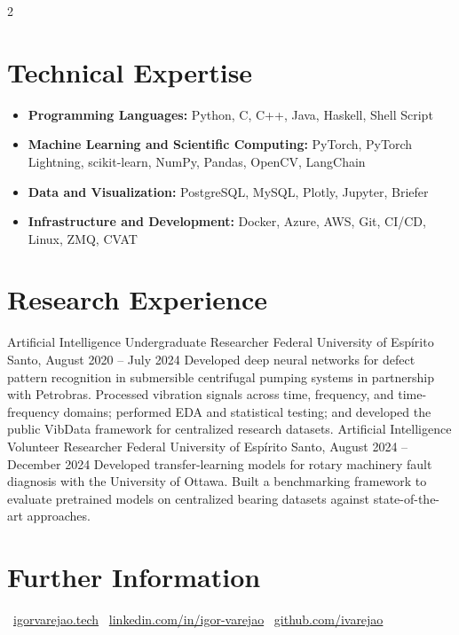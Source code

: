 \begin{multicols}{2}
\section{Technical Expertise}
\begin{itemize}[leftmargin=0.15in, label=\textbullet, itemsep=0pt, topsep=1pt]
  \item \textbf{Programming Languages:} Python, C, C++, Java, Haskell, Shell Script
  \item \textbf{Machine Learning and Scientific Computing:} PyTorch, PyTorch Lightning, scikit-learn, NumPy, Pandas, OpenCV, LangChain
  \item \textbf{Data and Visualization:} PostgreSQL, MySQL, Plotly, Jupyter, Briefer
  \item \textbf{Infrastructure and Development:} Docker, Azure, AWS, Git, CI/CD, Linux, ZMQ, CVAT
\end{itemize}

\section{Research Experience}
\columnresearch
  {Artificial Intelligence Undergraduate Researcher}
  {Federal University of Espírito Santo, August 2020 -- July 2024}
  {Developed deep neural networks for defect pattern recognition in submersible centrifugal pumping systems in partnership with Petrobras. Processed vibration signals across time, frequency, and time-frequency domains; performed EDA and statistical testing; and developed the public VibData framework for centralized research datasets.}
\vspace{10pt}
  \columnresearch
  {Artificial Intelligence Volunteer Researcher}
  {Federal University of Espírito Santo, August 2024 -- December 2024}
  {Developed transfer-learning models for rotary machinery fault diagnosis with the University of Ottawa. Built a benchmarking framework to evaluate pretrained models on centralized bearing datasets against state-of-the-art approaches.}

\renewcommand{\refname}{Selected Publications}

\nocite{VAREJAO2025112822,sehri2025universalvibrationanalysisdataset,LNLM2023-21022}



\end{multicols}

\section{Further Information}
\begin{center}
  \small
  \textbullet\ \href{https://igorvarejao.tech}{igorvarejao.tech} \quad
  \textbullet\ \href{https://www.linkedin.com/in/igor-varejao}{linkedin.com/in/igor-varejao} \quad
  \textbullet\ \href{https://github.com/ivarejao}{github.com/ivarejao}
\end{center}

